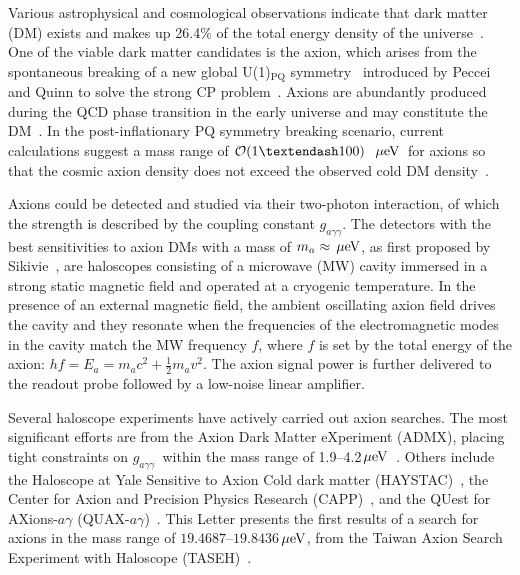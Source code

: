 \documentclass[%
 reprint,prl, %
superscriptaddress,
nobibnotes,
 amsmath,amssymb,
 aps,
]{revtex4-2}
\newcommand{\bgagg}{\ensuremath{g_{a\gamma\gamma}}}
\newcommand{\ma}{\ensuremath{m_a}}
\newcommand{\muevcc}{\ensuremath{\,\mu\text{e\hspace{-.08em}V}}}
\newcommand{\mlo}{\ensuremath{19.4687}}
\newcommand{\mhi}{\ensuremath{19.8436}}
\begin{document}
Various astrophysical and cosmological observations indicate that dark matter 
(DM) exists and makes up 26.4\% of the total energy density of the 
universe~\cite{DMI,DMII,DMIII,DMIV,PDG}. One of the viable dark matter 
candidates is the axion, which arises from the spontaneous breaking of a new 
global U(1)$_\mathrm{PQ}$ symmetry~\cite{strongCPI}  
introduced by Peccei and Quinn to solve the strong CP 
problem~\cite{strongCPI,strongCPII,strongCPIII}. 
Axions are abundantly produced during the QCD phase transition in 
the early universe and may constitute the 
DM~\cite{ADDONI,ADDONII,ADDONIII,ADDONIV}. 
In the post-inflationary PQ symmetry breaking scenario, 
current calculations suggest a mass range of 
${\cal O}(1–100)$~\muevcc\ for axions so that the cosmic axion density does 
not exceed the 
observed cold DM density~\cite{QCDCalI,QCDCalII,QCDCalIII,QCDCalIV,QCDCalV,QCDCalVI,QCDCalVII,QCDCalVIII,QCDCalIX,QCDCalX,QCDCalXI,QCDCalXII,QCDCalXIII,QCDCalXIV}. 
%

Axions could be detected and studied via their two-photon interaction, 
of which the strength is described by the coupling constant \bgagg. 
The detectors with the best sensitivities to axion DMs with a mass of 
$\ma\approx \muevcc$, as first proposed by 
Sikivie~\cite{SikivieI,SikivieII}, are haloscopes consisting of a microwave 
(MW) cavity immersed in a strong static 
magnetic field and operated at a cryogenic temperature. 
In the presence of an external magnetic field, the ambient oscillating axion 
field drives the cavity and they resonate when the frequencies of the 
electromagnetic 
modes in the cavity match the MW frequency $f$, where $f$ is set by 
the total energy of the axion: $hf=E_a=\ma c^2 + \frac{1}{2}\ma v^2$. The 
axion signal power is further delivered 
to the readout probe followed by a low-noise linear amplifier. 

Several haloscope experiments have actively carried out axion searches. 
The most significant efforts are from the Axion Dark Matter 
eXperiment (ADMX), placing tight constraints on \bgagg\ 
within the mass range of 
1.9--4.2\muevcc~\cite{ADMXI,ADMXII,ADMXIII,ADMXIV,ADMXV,ADMXVI,ADMXVII}. 
Others include the Haloscope at Yale Sensitive to Axion Cold dark matter 
(HAYSTAC)~\cite{HAYSTACIII,HAYSTACIV,HAYSTACI}, the Center 
for Axion and Precision Physics Research 
(CAPP)~\cite{CAPPII,CAPPIII,CAPPI,CAPPIV}, 
and the QUest for AXions-$a\gamma$ (QUAX-$a\gamma$)~\cite{QUAX}. 
%
This Letter presents the first results 
of a search for axions in the mass range of \mlo--\mhi\muevcc, 
from the Taiwan Axion Search Experiment with Haloscope (TASEH)~\cite{ADMXUnPub}. 
\end{document}
